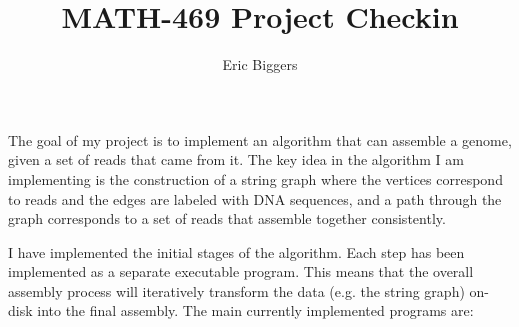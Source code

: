 \documentclass[letterpaper,12pt]{article}
\title{MATH-469 Project Checkin}
\author{Eric Biggers}
\begin{document}
\maketitle

The goal of my project is to implement an algorithm that can assemble a genome,
given a set of reads that came from it.  The key idea in the algorithm I am
implementing is the construction of a string graph where the vertices correspond
to reads and the edges are labeled with DNA sequences, and a path through the
graph corresponds to a set of reads that assemble together consistently.

I have implemented the initial stages of the algorithm.  Each step has been
implemented as a separate executable program.  This means that the overall
assembly process will iteratively transform the data (e.g. the string graph)
on-disk into the final assembly.  The main currently implemented programs are:
\end{document}
